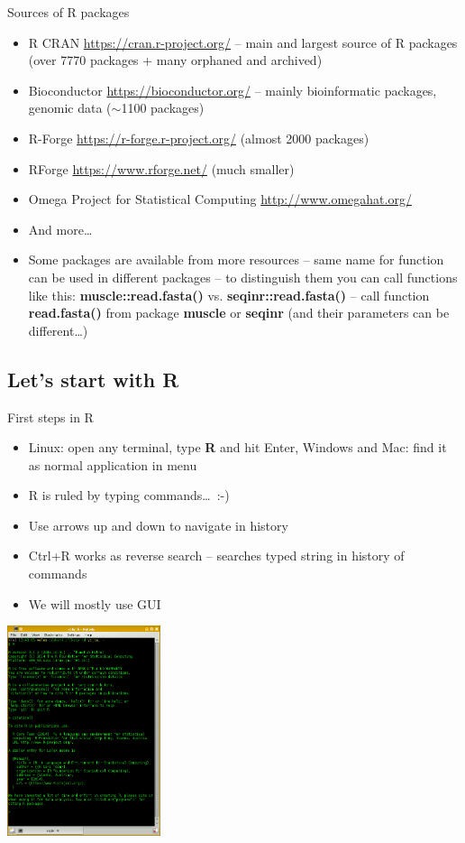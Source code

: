 \documentclass[compress, ucs, xelatex, 11pt, xcolor=svgnames,
  hyperref={
    bookmarks=true,
    unicode=true,
    colorlinks=true,
    pdftitle={Molecular data in R},
    plainpages=false,
    pdfauthor={Vojtech Zeisek},
    pdfsubject={Course about phylogeny and evolution in R},
    pdfcreator={XeLaTeX},
    pdfkeywords={R, evolution, phylogeny, molecular data},
    linkcolor=Tomato,
    anchorcolor=SaddleBrown,
    citecolor=Goldenrod,
    filecolor=DarkMagenta,
    menucolor=Sienna,
    urlcolor=DarkTurquoise,
    pdftex},
  url={hyphens, lowtilde} %
  ]{beamer}
\begin{document}
\begin{frame}{Sources of R packages}
\begin{itemize}
 \item R CRAN \url{https://cran.r-project.org/} -- main and largest source of R packages (over 7770 packages + many orphaned and archived)
 \item Bioconductor \url{https://bioconductor.org/} -- mainly bioinformatic packages, genomic data ($\sim$1100 packages)
 \item R-Forge \url{https://r-forge.r-project.org/} (almost 2000 packages)
 \item RForge \url{https://www.rforge.net/} (much smaller)
 \item Omega Project for Statistical Computing \url{http://www.omegahat.org/}
 \item And more\ldots
 \item Some packages are available from more resources -- same name for function can be used in different packages -- to distinguish them you can call functions like this: \textbf{muscle::read.fasta()} vs. \textbf{seqinr::read.fasta()} -- call function \textbf{read.fasta()} from package \textbf{muscle} \alert{or} \textbf{seqinr} (and their parameters can be different\ldots)
\end{itemize}
\end{frame}

\subsection{Let's start with R}

\begin{frame}{First steps in R}
\begin{multicols}{2}
  \begin{itemize}
    \item Linux: open any terminal, type \textbf{R} and hit Enter, Windows and Mac: find it as normal application in menu
    \item R is ruled by typing commands\ldots~:-)
    \item Use arrows up and down to navigate in history
    \item Ctrl+R works as reverse search -- searches typed string in history of commands
    \item We will mostly use GUI
  \end{itemize}
  \columnbreak
  \begin{flushright}
    \includegraphics[width=4.5cm]{rkonsole.png}
  \end{flushright}
\end{multicols}
\end{frame}
\end{document}
